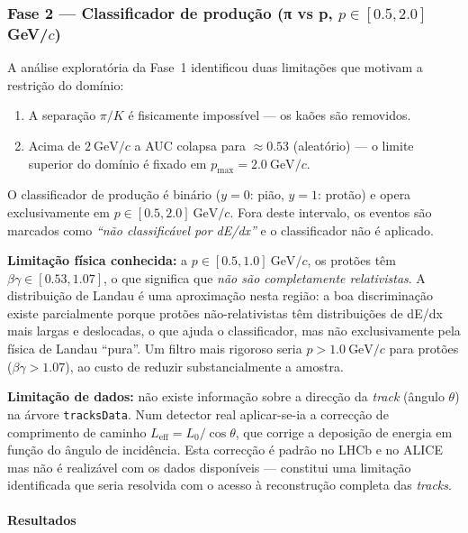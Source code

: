 \documentclass[12pt,a4paper]{article}
\begin{document}
\subsubsection{Fase 2 — Classificador de produção (π vs p, $p \in [0.5, 2.0]$ GeV/$c$)}

A análise exploratória da Fase~1 identificou duas limitações que motivam a
restrição do domínio:
\begin{enumerate}
  \item A separação $\pi/K$ é fisicamente impossível — os kaões são removidos.
  \item Acima de $2~\text{GeV}/c$ a AUC colapsa para $\approx 0.53$ (aleatório)
    — o limite superior do domínio é fixado em $p_\text{max} = 2.0~\text{GeV}/c$.
\end{enumerate}

O classificador de produção é binário ($y = 0$: pião, $y = 1$: protão) e
opera exclusivamente em $p \in [0.5, 2.0]~\text{GeV}/c$.
Fora deste intervalo, os eventos são marcados como \emph{``não classificável
por dE/dx''} e o classificador não é aplicado.

\textbf{Limitação física conhecida:} a $p \in [0.5, 1.0]~\text{GeV}/c$, os
protões têm $\beta\gamma \in [0.53, 1.07]$, o que significa que \emph{não são
completamente relativistas}. A distribuição de Landau é uma aproximação nesta
região: a boa discriminação existe parcialmente porque protões não-relativistas
têm distribuições de dE/dx mais largas e deslocadas, o que ajuda o classificador,
mas não exclusivamente pela física de Landau ``pura''. Um filtro mais rigoroso
seria $p > 1.0~\text{GeV}/c$ para protões ($\beta\gamma > 1.07$), ao custo de
reduzir substancialmente a amostra.

\textbf{Limitação de dados:} não existe informação sobre a direcção da
\textit{track} (ângulo $\theta$) na árvore \texttt{tracksData}. Num detector
real aplicar-se-ia a correcção de comprimento de caminho
$L_\text{eff} = L_0 / \cos\theta$, que corrige a deposição de energia em
função do ângulo de incidência. Esta correcção é padrão no LHCb e no ALICE
mas não é realizável com os dados disponíveis --- constitui uma limitação
identificada que seria resolvida com o acesso à reconstrução completa das
\textit{tracks}.

\paragraph*{Resultados}
\end{document}

